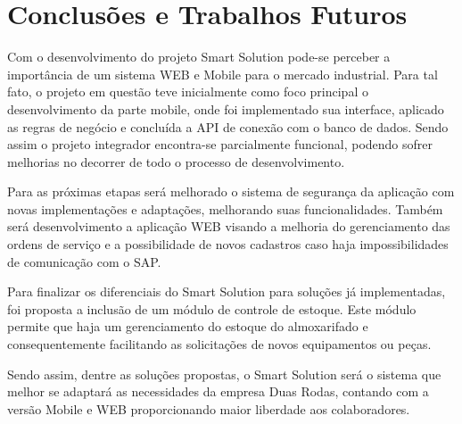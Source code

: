 \chapter{Conclusões e Trabalhos Futuros}
Com o desenvolvimento do projeto Smart Solution pode-se perceber a importância de um sistema WEB e Mobile para o mercado industrial. Para tal fato, o projeto em questão teve inicialmente como foco principal o desenvolvimento da parte mobile, onde foi implementado sua interface, aplicado as regras de negócio e concluída a API de conexão com o banco de dados. Sendo assim o projeto integrador encontra-se parcialmente funcional, podendo sofrer melhorias no decorrer de todo o processo de desenvolvimento.

Para as próximas etapas será melhorado o sistema de segurança da aplicação com novas implementações e adaptações, melhorando suas funcionalidades. Também será desenvolvimento a aplicação WEB visando a melhoria do gerenciamento das ordens de serviço e a possibilidade de novos cadastros caso haja impossibilidades de comunicação com o SAP.

Para finalizar os diferenciais do Smart Solution para soluções já implementadas, foi proposta a inclusão de um módulo de controle de estoque. Este módulo permite que haja um gerenciamento do estoque do almoxarifado e consequentemente facilitando as solicitações de novos equipamentos ou peças.

Sendo assim, dentre as soluções propostas, o Smart Solution será o sistema que melhor se adaptará as necessidades da empresa Duas Rodas, contando com a versão Mobile e WEB proporcionando maior liberdade aos colaboradores.








